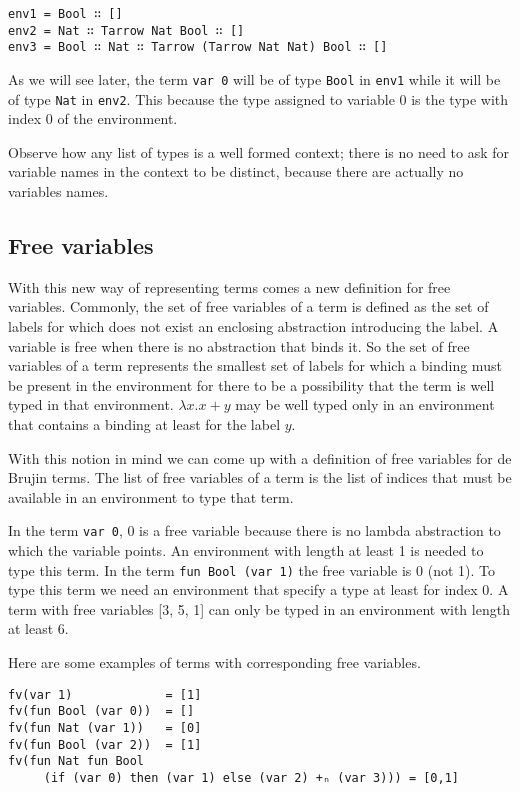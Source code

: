 \documentclass{article}
\begin{document}
\begin{verbatim}
env1 = Bool ∷ []
env2 = Nat ∷ Tarrow Nat Bool ∷ []
env3 = Bool ∷ Nat ∷ Tarrow (Tarrow Nat Nat) Bool ∷ []
\end{verbatim}

As we will see later, the term \texttt{var 0} will be of type \texttt{Bool} in \texttt{env1} while it will be of type \texttt{Nat} in \texttt{env2}.
This because the type assigned to variable 0 is the type with index 0 of the environment.

Observe how any list of types is a well formed context; there is no need to ask for variable names in the context to be distinct, because there are actually no variables names.


\subsection{Free variables}

With this new way of representing terms comes a new definition for free variables.
Commonly, the set of free variables of a term is defined as the set of labels for which does not exist an enclosing abstraction introducing the label.
A variable is free when there is no abstraction that binds it.
So the set of free variables of a term represents the smallest set of labels for which a binding must be present in the environment for there to be a possibility that the term is well typed in that environment.
$\lambda x. x + y$ may be well typed only in an environment that contains a binding at least for the label $y$.

With this notion in mind we can come up with a definition of free variables for de Brujin terms.
The list of free variables of a term is the list of indices that must be available in an environment to type that term.

In the term \texttt{var 0}, 0 is a free variable because there is no lambda abstraction to which the variable points.
An environment with length at least 1 is needed to type this term.
In the term \texttt{fun Bool (var 1)} the free variable is 0 (not 1).
To type this term we need an environment that specify a type at least for index 0.
A term with free variables [3, 5, 1] can only be typed in an environment with length at least 6.

Here are some examples of terms with corresponding free variables.

\begin{verbatim}
fv(var 1)             = [1]
fv(fun Bool (var 0))  = []
fv(fun Nat (var 1))   = [0]
fv(fun Bool (var 2))  = [1]
fv(fun Nat fun Bool
     (if (var 0) then (var 1) else (var 2) +ₙ (var 3))) = [0,1]
\end{verbatim}
\end{document}
